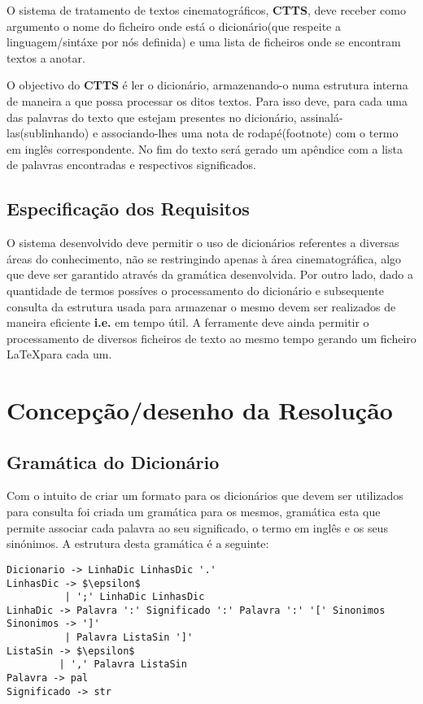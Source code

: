 \documentclass{llncs}
\begin{document}
O sistema de tratamento de textos cinematográficos, \textbf{CTTS}, deve receber como argumento o nome do ficheiro onde está o dicionário(que respeite a linguagem/sintáxe por nós definida) e uma lista de ficheiros onde se encontram textos a anotar.

O objectivo do \textbf{CTTS} é ler o dicionário, armazenando-o numa estrutura interna de maneira a que possa processar os ditos textos. Para isso deve, para cada uma das palavras do texto que estejam presentes no dicionário, assinalá-las(sublinhando) e associando-lhes uma nota de rodapé(footnote) com o termo em inglês correspondente. No fim do texto será gerado um apêndice com a lista de palavras encontradas e respectivos significados.

\subsection{Especificação dos Requisitos}
O sistema desenvolvido deve permitir o uso de dicionários referentes a diversas áreas do conhecimento, não se restringindo apenas à área cinematográfica, algo que deve ser garantido através da gramática desenvolvida. Por outro lado, dado a quantidade de termos possíves o processamento do dicionário e subsequente consulta da estrutura usada para armazenar o mesmo devem ser realizados de maneira eficiente \textbf{i.e.} em tempo útil. A ferramente deve ainda permitir o processamento de diversos ficheiros de texto ao mesmo tempo gerando um ficheiro \LaTeX para cada um.

\section{Concepção/desenho da Resolução}

\subsection{Gramática do Dicionário}
Com o intuito de criar um formato para os dicionários que devem ser utilizados para consulta foi criada um gramática para os mesmos, gramática esta que permite associar cada palavra ao seu significado, o termo em inglês e os seus sinónimos. 
A estrutura desta gramática é a seguinte:
\begin{lstlisting}[mathescape]
Dicionario -> LinhaDic LinhasDic '.' 
LinhasDic -> $\epsilon$ 
          | ';' LinhaDic LinhasDic 
LinhaDic -> Palavra ':' Significado ':' Palavra ':' '[' Sinonimos 
Sinonimos -> ']' 
          | Palavra ListaSin ']' 
ListaSin -> $\epsilon$ 
         | ',' Palavra ListaSin 
Palavra -> pal 
Significado -> str 
\end{lstlisting}
\end{document}

